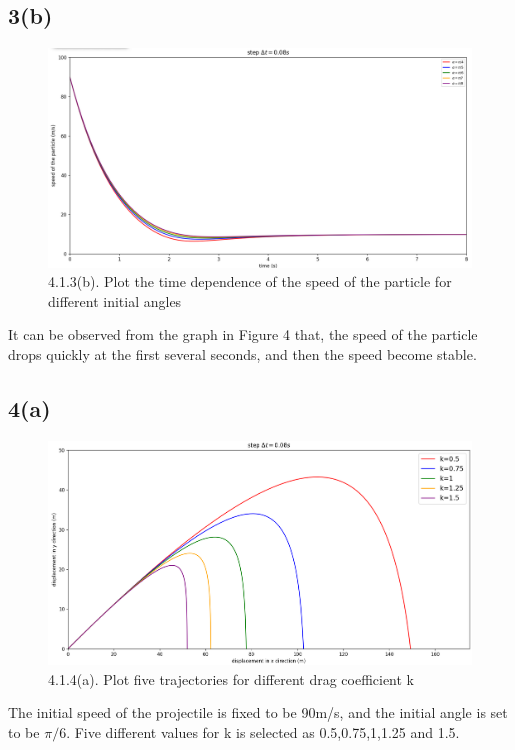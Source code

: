 \documentclass{article}
\begin{document}
\subsection*{3(b)}
\begin{figure}[H]
  \centering
  \includegraphics[scale=0.4]{./graphs/project4.1.3(b).png}
  \caption{4.1.3(b). Plot the time dependence of the speed of the particle for different initial angles}
\end{figure}
It can be observed from the graph in Figure 4 that, the speed of the particle drops quickly at the first several seconds, and then the speed become stable.

\vspace{0.03\textheight}
\subsection*{4(a)}
\begin{figure}[H]
  \centering
  \includegraphics[scale=0.4]{./graphs/project4.1.4(a).png}
  \caption{4.1.4(a). Plot five trajectories for different drag coefficient k}
\end{figure}
\vspace{0.01\textheight}
The initial speed of the projectile is fixed to be 90m/s, and the initial angle is set to be $\pi/6$. Five different values for k is selected as 0.5,0.75,1,1.25 and 1.5.
\end{document}
